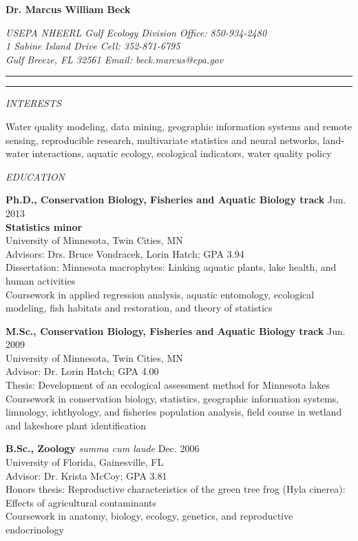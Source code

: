 \documentclass[letterpaper,12pt]{article}
\newcommand{\sectitle}[1]{\vspace{\baselineskip} \centerline{\large{\textit{#1}}}}
\begin{document}
\raggedright

\LARGE
\centerline{{\bf Dr. Marcus William Beck}}
\normalsize
\textit{USEPA NHEERL Gulf Ecology Division \hfill Office: 850-934-2480 \\
1 Sabine Island Drive \hfill Cell: 352-871-6795 \\
Gulf Breeze, FL 32561 \hfill Email: beck.marcus@epa.gov}
\vspace{4pt}
\hrule
\vspace{2pt}
\hrule
\vspace{4pt}

\sectitle{INTERESTS}

Water quality modeling, data mining, geographic information systems and remote sensing, reproducible research, multivariate statistics and neural networks, land-water interactions, aquatic ecology, ecological indicators, water quality policy

\sectitle{EDUCATION}

{\bf Ph.D., Conservation Biology, Fisheries and Aquatic Biology track} \hfill Jun. 2013 \\
{\bf Statistics minor} \\
University of Minnesota, Twin Cities, MN \\
Advisors: Drs. Bruce Vondracek, Lorin Hatch; GPA 3.94 \\
Dissertation: Minnesota macrophytes: Linking aquatic plants, lake health, and human activities\\
Coursework in applied regression analysis, aquatic entomology, ecological modeling, fish habitats and restoration, and theory of statistics

{\bf M.Sc., Conservation Biology, Fisheries and Aquatic Biology track} \hfill Jun. 2009 \\
University of Minnesota, Twin Cities, MN \\
Advisor: Dr. Lorin Hatch; GPA 4.00 \\
Thesis: Development of an ecological assessment method for Minnesota lakes \\
Coursework in conservation biology, statistics, geographic information systems, limnology, ichthyology, and fisheries population analysis, field course in wetland and lakeshore plant identification

{\bf B.Sc., Zoology} \textit{summa cum laude} \hfill Dec. 2006 \\
University of Florida, Gainesville, FL \\
Advisor: Dr. Krista McCoy; GPA 3.81 \\
Honors thesis: Reproductive characteristics of the green tree frog (Hyla cinerea): Effects of agricultural contaminants \\
Coursework in anatomy, biology, ecology, genetics, and reproductive endocrinology
\end{document}
